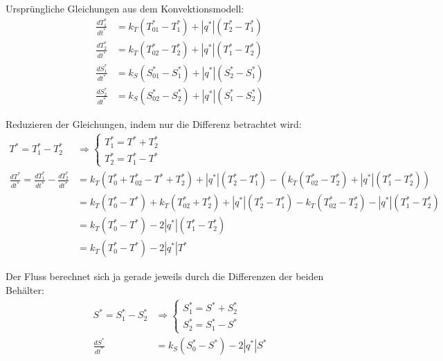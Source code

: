 \documentclass[11pt,a4paper]{article}
\begin{document}
	Ursprüngliche Gleichungen aus dem Konvektionsmodell:
	\begin{align*}
		\frac{dT^*_1}{dt^*} &= k_T\left(T^*_{01} - T^*_1\right) + \left|q^*\right|\left(T^*_2 - T^*_1\right) \\
		\frac{dT^*_2}{dt^*} &= k_T\left(T^*_{02} - T^*_2\right) + \left|q^*\right|\left(T^*_1 - T^*_2\right) \\
		\frac{dS^*_1}{dt^*} &= k_S\left(S^*_{01} - S^*_1\right) + \left|q^*\right|\left(S^*_2 - S^*_1\right) \\
		\frac{dS^*_2}{dt^*} &= k_S\left(S^*_{02} - S^*_2\right) + \left|q^*\right|\left(S^*_1 - S^*_2\right)
	\end{align*}
	
	Reduzieren der Gleichungen, indem nur die Differenz betrachtet wird:
	\begin{align*}
		T^* = T^*_1 - T^*_2 &\Rightarrow \left\{
		\begin{array}{l}
			T^*_1 = T^* + T^*_2 \\
			T^*_2 = T^*_1 - T^*
		\end{array} \right. \\
		\frac{dT^*}{dt^*} = \frac{dT^*_1}{dt^*} - \frac{dT^*_2}{dt^*} &= 
		k_T\left(T^*_{0} + T^*_{02} - T^* + T^*_2 \right) + \left|q^*\right|\left(T^*_2 - T^*_1\right)  - \left( k_T\left(T^*_{02} - T^*_2\right) + \left|q^*\right|\left(T^*_1 - T^*_2\right) \right) \\
		&= k_T\left(T^*_{0} - T^*\right) + k_T\left(T^*_{02} + T^*_2\right) + \left|q^*\right|\left(T^*_2 - T^*_1\right) - k_T\left(T^*_{02} - T^*_2\right) - \left|q^*\right|\left(T^*_1 - T^*_2\right) \\
		&= k_T\left(T^*_{0} - T^*\right) - 2\left|q^*\right|\left(T^*_1 - T^*_2\right) \\
		&= k_T\left(T^*_{0} - T^*\right) - 2\left|q^*\right|T^*
	\end{align*}
	
	Der Fluss berechnet sich ja gerade jeweils durch die Differenzen der beiden Behälter:
	\begin{align*}
		S^* = S^*_1 - S^*_2 &\Rightarrow \left\{
		\begin{array}{l}
			S^*_1 = S^* + S^*_2 \\
			S^*_2 = S^*_1 - S^*
		\end{array} \right. \\
		\frac{dS^*}{dt^*} &= k_S\left(S^*_{0} - S^*\right) - 2\left|q^*\right|S^*
	\end{align*}
	
\end{document}
